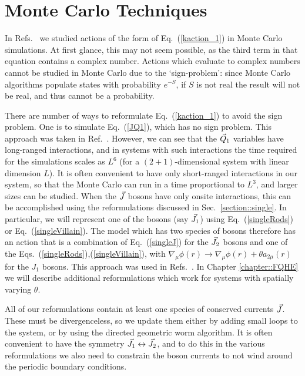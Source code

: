 \section{Monte Carlo Techniques}

In Refs.~\cite{Loopy,short_range3,Gen2Loops,FQHE} we studied actions of the form of Eq.~(\ref{kaction_1}) in Monte Carlo simulations. At first glance, this may not seem possible, as the third term in that equation contains a complex number. Actions which evaluate to complex numbers cannot be studied in Monte Carlo due to the `sign-problem': since Monte Carlo algorithms populate states with probability $e^{-S}$, if $S$ is not real the result will not be real, and thus cannot be a probability.

There are number of ways to reformulate Eq.~(\ref{kaction_1}) to avoid the sign problem. One is to simulate Eq.~(\ref{JQ1}), which has no sign problem. This approach was taken in Ref.~\cite{Gen2Loops}. However, we can see that the $\vec{Q}_1$ variables have long-ranged interactions, and in systems with such interactions the time required for the simulations scales as $L^6$ (for a $(2+1)$-dimensional system with linear dimension $L$). It is often convenient to have only short-ranged interactions in our system, so that the Monte Carlo can run in a time proportional to $L^3$, and larger sizes can be studied. 
When the $\vec{J}$ bosons have only onsite interactions, this can be accomplished using the reformulations discussed in Sec.~\ref{section::single}. In particular, we will represent one of the bosons (say $\vec{J}_1$) using Eq.~(\ref{singleRods}) or Eq.~(\ref{singleVillain}). The model which has two species of bosons therefore has an action that is a combination of Eq.~(\ref{singleJ}) for the $\vec{J}_2$ bosons and one of the Eqs.~(\ref{singleRods}),(\ref{singleVillain}), with $\nabla_\mu\phi(r)\rightarrow\nabla_\mu\phi(r)+\theta a_{2\mu}(r)$ for the $J_1$ bosons. This approach was used in Refs.~\cite{Loopy,short_range3}. 
In Chapter \ref{chapter::FQHE} we will describe additional reformulations which work for systems with spatially varying $\theta$. 

All of our reformulations contain at least one species of conserved currents $\vec{J}$. These must be divergenceless, so we update them either by adding small loops to the system, or by using the directed geometric worm algorithm\cite{Sorensen}. It is often convenient to have the symmetry $\vec{J}_1\leftrightarrow\vec{J}_2$, and to do this in the various reformulations we also need to constrain the boson currents to not wind around the periodic boundary conditions.

